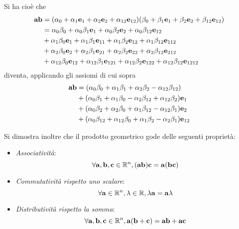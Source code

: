 \begin{frame}
    Si ha cioè che 
    \[\begin{aligned}
        \mathbf{ab} &= 
            (\alpha_{0} + \alpha_{1}\mathbf{e}_{1} + \alpha_{2}\mathbf{e}_{2} 
                + \alpha_{12}\mathbf{e}_{12})
            (\beta_{0} + \beta_{1}\mathbf{e}_{1} + \beta_{2}\mathbf{e}_{2}
                + \beta_{12}\mathbf{e}_{12}) \\
            & = \alpha_{0}\beta_{0} + \alpha_{0}\beta_{1}\mathbf{e}_{1}
            + \alpha_{0}\beta_{2}\mathbf{e}_{2} 
            + \alpha_{0}\beta_{12}\mathbf{e}_{12} \\
            & + \alpha_{1}\beta_{0}\mathbf{e}_{1} + \alpha_{1}\beta_{1}\mathbf{e}_{11}
              + \alpha_{1}\beta_{2}\mathbf{e}_{12} 
              + \alpha_{1}\beta_{12}\mathbf{e}_{112} \\
            & + \alpha_{2}\beta_{0}\mathbf{e}_{2} + \alpha_{2}\beta_{1}\mathbf{e}_{21}
              + \alpha_{2}\beta_{2}\mathbf{e}_{22} 
              + \alpha_{2}\beta_{12}\mathbf{e}_{212} \\ 
            & + \alpha_{12}\beta_{0}\mathbf{e}_{12} 
              + \alpha_{12}\beta_{1}\mathbf{e}_{121}
              + \alpha_{12}\beta_{2}\mathbf{e}_{122} 
              + \alpha_{12}\beta_{12}\mathbf{e}_{1212}  
    \end{aligned}\]
    diventa, applicando gli assiomi di cui sopra
    \[\begin{aligned}
        \mathbf{ab} & = 
            (\alpha_{0}\beta_{0} + \alpha_{1}\beta_{1} 
                + \alpha_{2}\beta_{2} - \alpha_{12}\beta_{12}) \\ 
            & + (\alpha_{0}\beta_{1} + \alpha_{1}\beta_{0} 
                - \alpha_{2}\beta_{12} + \alpha_{12}\beta_{2})\mathbf{e}_{1} \\
            & + (\alpha_{0}\beta_{2} + \alpha_{2}\beta_{0} 
                + \alpha_{1}\beta_{12} - \alpha_{12}\beta_{1})\mathbf{e}_{2} \\
            & + (\alpha_{0}\beta_{12} + \alpha_{12}\beta_{0} 
                + \alpha_{1}\beta_{2} - \alpha_{2}\beta_{1})\mathbf{e}_{12}
    \end{aligned}\]
\end{frame}
\begin{frame}
    Si dimostra inoltre che il prodotto geometrico gode delle seguenti proprietà:
    \begin{itemize}
        \item [ ] \emph{Associatività}: 
            \[
                \forall \mathbf{a}, \mathbf{b}, \mathbf{c} \in \mathbb{R}^{n},
            (\mathbf{ab})\mathbf{c} = \mathbf{a}(\mathbf{bc})
            \]
        \item [ ] \emph{Commutatività rispetto uno scalare}: 
            \[
                \forall \mathbf{a} \in \mathbb{R}^{n}, \lambda \in \mathbb{R}, 
                \lambda\mathbf{a} = \mathbf{a}\lambda
            \]
        \item [ ] \emph{Distributività rispetto la somma}:
            \[
                \forall \mathbf{a}, \mathbf{b}, \mathbf{c} \in \mathbb{R}^{n},
                \mathbf{a}(\mathbf{b} + \mathbf{c}) = \mathbf{ab} + \mathbf{ac}
            \]
    \end{itemize}
\end{frame}

